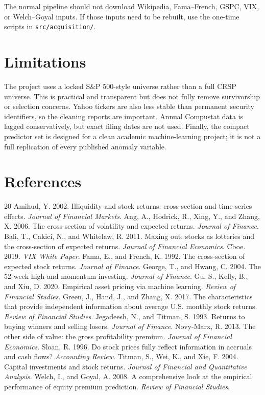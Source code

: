 \documentclass[11pt,a4paper]{article}
\newcommand{\code}[1]{\texttt{#1}}
\begin{document}
The normal pipeline should not download Wikipedia, Fama--French, GSPC, VIX, or Welch--Goyal inputs. If those inputs need to be rebuilt, use the one-time scripts in \code{src/acquisition/}.

\section{Limitations}

The project uses a locked S\&P 500-style universe rather than a full CRSP universe. This is practical and transparent but does not fully remove survivorship or selection concerns. Yahoo tickers are also less stable than permanent security identifiers, so the cleaning reports are important. Annual Compustat data is lagged conservatively, but exact filing dates are not used. Finally, the compact predictor set is designed for a clean academic machine-learning project; it is not a full replication of every published anomaly variable.

\section{References}

\begin{thebibliography}{20}
 Amihud, Y. 2002. Illiquidity and stock returns: cross-section and time-series effects. \textit{Journal of Financial Markets}.
 Ang, A., Hodrick, R., Xing, Y., and Zhang, X. 2006. The cross-section of volatility and expected returns. \textit{Journal of Finance}.
 Bali, T., Cakici, N., and Whitelaw, R. 2011. Maxing out: stocks as lotteries and the cross-section of expected returns. \textit{Journal of Financial Economics}.
 Cboe. 2019. \textit{VIX White Paper}.
 Fama, E., and French, K. 1992. The cross-section of expected stock returns. \textit{Journal of Finance}.
 George, T., and Hwang, C. 2004. The 52-week high and momentum investing. \textit{Journal of Finance}.
 Gu, S., Kelly, B., and Xiu, D. 2020. Empirical asset pricing via machine learning. \textit{Review of Financial Studies}.
 Green, J., Hand, J., and Zhang, X. 2017. The characteristics that provide independent information about average U.S. monthly stock returns. \textit{Review of Financial Studies}.
 Jegadeesh, N., and Titman, S. 1993. Returns to buying winners and selling losers. \textit{Journal of Finance}.
 Novy-Marx, R. 2013. The other side of value: the gross profitability premium. \textit{Journal of Financial Economics}.
 Sloan, R. 1996. Do stock prices fully reflect information in accruals and cash flows? \textit{Accounting Review}.
 Titman, S., Wei, K., and Xie, F. 2004. Capital investments and stock returns. \textit{Journal of Financial and Quantitative Analysis}.
 Welch, I., and Goyal, A. 2008. A comprehensive look at the empirical performance of equity premium prediction. \textit{Review of Financial Studies}.
\end{thebibliography}
\end{document}
